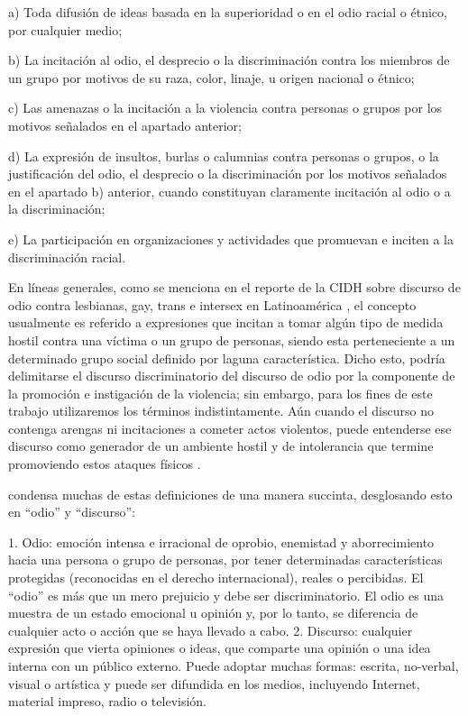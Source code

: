 \begin{displayquote}

    a) Toda difusión de ideas basada en la superioridad o en el odio racial o étnico, por cualquier medio;

    b) La incitación al odio, el desprecio o la discriminación contra los miembros de un grupo por motivos de su raza, color, linaje, u origen nacional o étnico;

    c) Las amenazas o la incitación a la violencia contra personas o grupos por los motivos señalados en el apartado anterior;

    d) La expresión de insultos, burlas o calumnias contra personas o grupos, o la justificación del odio, el desprecio o la discriminación por los motivos señalados en el apartado b) anterior, cuando constituyan claramente incitación al odio o a la discriminación;

    e) La participación en organizaciones y actividades que promuevan e inciten a la discriminación racial.
\end{displayquote}


En líneas generales, como se menciona en el reporte de la CIDH sobre discurso de odio contra lesbianas, gay, trans e intersex en Latinoamérica \cite{CIDH2015}, el concepto usualmente es referido a expresiones que incitan a tomar algún tipo de medida hostil contra una víctima o un grupo de personas, siendo esta perteneciente a un determinado grupo social definido por laguna característica. Dicho esto, podría delimitarse el discurso discriminatorio del discurso de odio por la componente de la promoción e instigación de la violencia; sin embargo, para los fines de este trabajo utilizaremos los términos indistintamente. Aún cuando el discurso no contenga arengas ni incitaciones a cometer actos violentos, puede entenderse ese discurso como generador de un ambiente hostil y de intolerancia que termine promoviendo estos ataques físicos \cite{CIDH2015}.

\citet{article192015} condensa muchas de estas definiciones de una manera succinta, desglosando esto en ``odio'' y ``discurso'':

\begin{displayquote}
    1. Odio: emoción intensa e irracional de oprobio, enemistad y aborrecimiento hacia una persona o grupo de personas, por tener determinadas características protegidas (reconocidas en el derecho internacional), reales o percibidas. El “odio” es más que un mero prejuicio y debe ser discriminatorio. El odio es una muestra de un estado emocional u opinión y, por lo tanto, se diferencia de cualquier acto o acción que se haya llevado a cabo.
    2. Discurso: cualquier expresión que vierta opiniones o ideas, que comparte una opinión o una idea interna con un público externo. Puede adoptar muchas formas: escrita, no-verbal, visual o artística y puede ser difundida en los medios, incluyendo Internet, material impreso, radio o televisión.
\end{displayquote}

